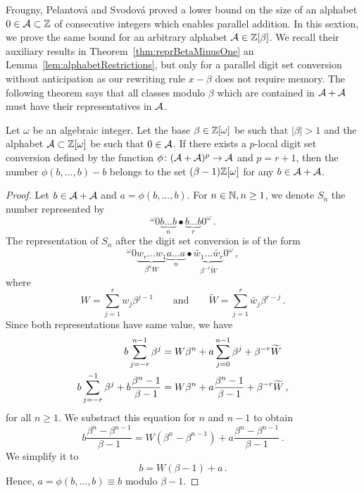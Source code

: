 Frougny, Pelantov\'a and Svodov\'a \cite{minAlph} proved a lower bound on the size of an alphabet $0\in\mathcal{A}\subset\mathbb{Z}$ of consecutive integers which enables parallel addition. In this sextion, we prove the same bound for an arbitrary alphabet $\mathcal{A}\in\mathbb{Z}[\beta]$. We recall their auxiliary results in Theorem~\ref{thm:reprBetaMinusOne} an Lemma~\ref{lem:alphabetRestrictions}, but only for a parallel digit set conversion without anticipation as our rewriting rule $x-\beta$ does not require memory. The following theorem says that all classes modulo $\beta$ which are contained in $\mathcal{A}+\mathcal{A}$ must have their representatives in $\mathcal{A}$.
\begin{thm}
\label{thm:reprBetaMinusOne}
Let $\omega$ be an algebraic integer. Let the base $\beta\in\mathbb{Z}[\omega]$ be such that $|\beta|>1$ and the alphabet $\mathcal{A}\subset\mathbb{Z}[\omega]$ be such that $0\in\mathcal{A}$. If there exists a $p$-local digit set conversion defined by the function $\phi\colon (\mathcal{A}+\mathcal{A})^p\rightarrow \mathcal{A}$ and $p=r+1$, then the number $\phi(b,\dots,b)-b$ belongs to the set $(\beta-1)\mathbb{Z}[\omega]$ for any $b\in\mathcal{A}+\mathcal{A}$. 
\end{thm}
\begin{proof}
Let $b\in\mathcal{A}+\mathcal{A}$ and $a=\phi(b, \dots,b)$. For $n\in\mathbb{N}, n\geq 1$, we denote $S_n$ the number represented by
$$
^{\omega}\!0 \underbrace{b\dots b}_{n}\bullet \underbrace{b\dots b}_{r}0^\omega\,.
$$
The representation of $S_n$ after the digit set conversion is of the form
$$
^{\omega}\!0 \underbrace{w_{r}\dots w_{1}}_{\beta^n W}\underbrace{a\dots a}_{n}\bullet \underbrace{\widetilde{w_1}\dots \widetilde{w_r}}_{\beta^{-r}\widetilde{W}}0^\omega\,,
$$
where 
$$W=\sum_{j=1}^r w_j \beta^{j-1} \qquad \text{and} \qquad \widetilde{W}=\sum_{j=1}^r\widetilde{w_j} \beta^{r-j}\,.$$
Since both representations have same value, we have
\begin{align}
\label{eq:reprBetaMinusOne}
b \sum_{j=-r}^{n-1} \beta^j &= W \beta^n + a \sum_{j=0}^{n-1} \beta^j + \beta^{-r}\widetilde{W} \notag \\
b \sum_{j=-r}^{-1} \beta^j +b\frac{\beta^n-1}{\beta-1} &= W \beta^n + a \frac{\beta^n-1}{\beta-1} + \beta^{-r}\widetilde{W}\,,
\end{align}
for all $n\geq 1$. We substract this equation for $n$ and $n-1$ to obtain
$$
b\frac{\beta^n-\beta^{n-1}}{\beta-1}=W(\beta^n-\beta^{n-1}) + a\frac{\beta^n-\beta^{n-1}}{\beta-1}\,.
$$
We simplify it to
\begin{equation}
\label{eq:reprBetaMinusOneFinal}
b=W(\beta-1) + a\,.
\end{equation}
Hence, $a=\phi(b, \dots,b)\equiv b$ modulo $\beta-1$.
\end{proof}

